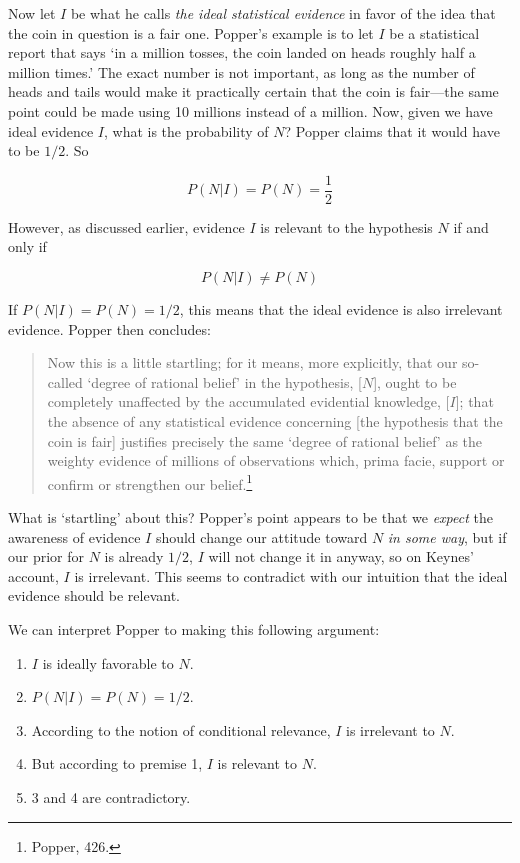 Now let \(I\) be what he calls \emph{the ideal statistical evidence} in
favor of the idea that the coin in question is a fair one. Popper's
example is to let \(I\) be a statistical report that says `in a million
tosses, the coin landed on heads roughly half a million times.' The
exact number is not important, as long as the number of heads and tails
would make it practically certain that the coin is fair---the same point
could be made using 10 millions instead of a million. Now, given we have
ideal evidence \(I\), what is the probability of \(N\)? Popper claims
that it would have to be \(1/2\). So

\[P (N|I) = P(N) = \frac{1}{2}\]

\noindent However, as discussed earlier, evidence \(I\) is relevant to
the hypothesis \(N\) if and only if

\[ P(N|I) \neq P(N) \]

\noindent If \(P(N|I) = P(N) = 1/2\), this means that the ideal evidence
is also irrelevant evidence. Popper then concludes:

\begin{quote}
Now this is a little startling; for it means, more explicitly, that our
so-called `degree of rational belief' in the hypothesis, {[}\(N\){]},
ought to be completely unaffected by the accumulated evidential
knowledge, {[}\(I\){]}; that the absence of any statistical evidence
concerning {[}the hypothesis that the coin is fair{]} justifies
precisely the same `degree of rational belief' as the weighty evidence
of millions of observations which, prima facie, support or confirm or
strengthen our belief.\footnote{Popper, 426.}
\end{quote}

What is `startling' about this? Popper's point appears to be that we
\emph{expect} the awareness of evidence \(I\) should change our attitude
toward \(N\) \emph{in some way}, but if our prior for \(N\) is already
\(1/2\), \(I\) will not change it in anyway, so on Keynes' account,
\(I\) is irrelevant. This seems to contradict with our intuition that
the ideal evidence should be relevant.

We can interpret Popper to making this following argument:

\begin{enumerate}
\def\labelenumi{\arabic{enumi}.}
\tightlist
\item
  \(I\) is ideally favorable to \(N\).
\item
  \(P(N|I) = P(N) = 1/2\).
\item
  According to the notion of conditional relevance, \(I\) is irrelevant
  to \(N\).
\item
  But according to premise 1, \(I\) is relevant to \(N\).
\item
  3 and 4 are contradictory.
\end{enumerate}

